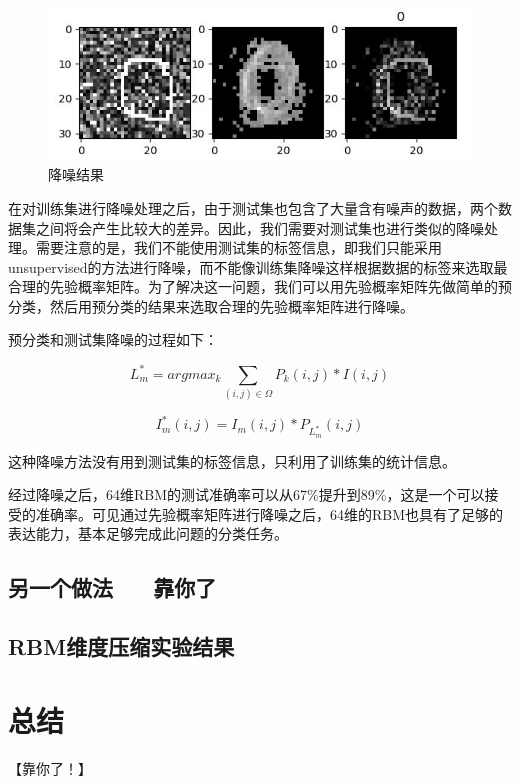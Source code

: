\documentclass[UTF8]{ctexart}
\begin{document}
\begin{figure}
	\centering
	\includegraphics{noise}
	\caption{降噪结果}
	\label{noise}
\end{figure}


在对训练集进行降噪处理之后，由于测试集也包含了大量含有噪声的数据，两个数据集之间将会产生比较大的差异。因此，我们需要对测试集也进行类似的降噪处理。需要注意的是，我们不能使用测试集的标签信息，即我们只能采用unsupervised的方法进行降噪，而不能像训练集降噪这样根据数据的标签来选取最合理的先验概率矩阵。为了解决这一问题，我们可以用先验概率矩阵先做简单的预分类，然后用预分类的结果来选取合理的先验概率矩阵进行降噪。


预分类和测试集降噪的过程如下：

$$ L^*_m = argmax_{k}{\sum_{(i, j) \in \Omega}{P_k(i, j) * I(i, j)}} $$

$$ I^*_m(i, j) = I_m(i, j) * P_{L^*_m}(i, j) $$

这种降噪方法没有用到测试集的标签信息，只利用了训练集的统计信息。

经过降噪之后，64维RBM的测试准确率可以从67\%提升到89\%，这是一个可以接受的准确率。可见通过先验概率矩阵进行降噪之后，64维的RBM也具有了足够的表达能力，基本足够完成此问题的分类任务。


\subsection{另一个做法 ~~ 靠你了}

\subsection{RBM维度压缩实验结果}

\section{总结}

【靠你了！】
\end{document}
